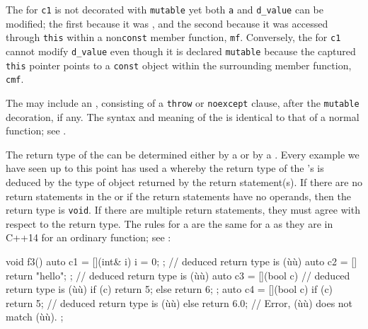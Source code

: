 The  for \lstinline!c1! is not decorated with
\lstinline!mutable! yet both \lstinline!a! and \lstinline!d_value! can be
modified; the first because it was , and
the second because it was accessed through \lstinline!this! within a
non\lstinline!const! member function, \lstinline!mf!. Conversely, the
 for \lstinline!c1! cannot modify
\lstinline!d_value! even though it is declared \lstinline!mutable! because
the captured \lstinline!this! pointer points to a \lstinline!const! object
within the surrounding member function, \lstinline!cmf!.

The  may include an , consisting of a \lstinline!throw! or \lstinline!noexcept!
clause, after the \lstinline!mutable! decoration, if any. The syntax and
meaning of the  is identical to that of
a normal function; see .

The return type of the  can be determined either
by a  or by a .
Every example we have seen up to this point has used a  whereby the return type of the 's
 is deduced by the type of object returned by the
return statement(s). If there are no return statements in the
 or if the return statements have no operands, then
the return type is \lstinline!void!. If there are multiple return
statements, they must agree with respect to the return type. The rules
for a  are the same for a  as they are in C++14 for an ordinary function; see :

\begin{emcppslisting}
void f3()
{
    auto c1 = [](int& i){ i = 0; };   // deduced return type is (ù{}ù)
    auto c2 = []{ return "hello"; };  // deduced return type is (ù{}ù)
    auto c3 = [](bool c)              // deduced return type is (ù{}ù)
    {
        if (c) { return 5; }
        else   { return 6; }
    };
    auto c4 = [](bool c)
    {
        if (c) { return 5; }          // deduced return type is (ù{}ù)
        else   { return 6.0; }        // Error, (ù{}ù) does not match (ù{}ù).
    };
}
\end{emcppslisting}
    

